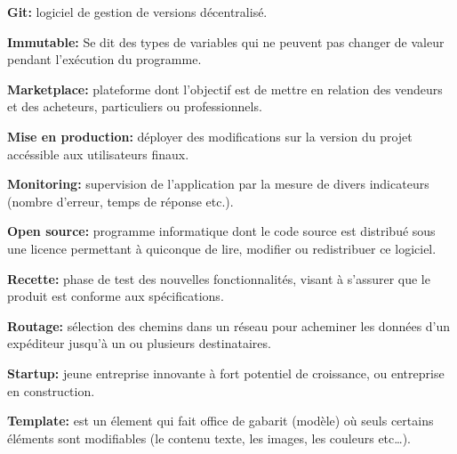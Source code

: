 \documentclass[12pt,a4paper]{article}
\begin{document}
  \bigskip

  \textbf{Git:} logiciel de gestion de versions décentralisé.

  \bigskip

  \textbf{Immutable:} Se dit des types de variables qui ne peuvent pas
  changer de valeur pendant l'exécution du programme.

  \bigskip

  \textbf{Marketplace:} plateforme dont l'objectif est de mettre en
  relation des vendeurs et des acheteurs, particuliers ou professionnels.

  \bigskip

  \textbf{Mise en production:} déployer des modifications sur la version
  du projet accéssible aux utilisateurs finaux.

  \bigskip

  \textbf{Monitoring:} supervision de l'application par la mesure de
  divers indicateurs (nombre d'erreur, temps de réponse etc.).

  \bigskip

  \textbf{Open source:} programme informatique dont le code source est
  distribué sous une licence permettant à quiconque de lire, modifier ou
  redistribuer ce logiciel.

  \bigskip

  \textbf{Recette:} phase de test des nouvelles fonctionnalités, visant à
  s'assurer que le produit est conforme aux spécifications.

  \bigskip

  \textbf{Routage:} sélection des chemins dans un réseau pour acheminer
  les données d'un expéditeur jusqu'à un ou plusieurs destinataires.

  \bigskip

  \textbf{Startup:} jeune entreprise innovante à fort potentiel de
  croissance, ou entreprise en construction.

  \bigskip

  \textbf{Template:} est un élement qui fait office de gabarit (modèle) où
  seuls certains éléments sont modifiables (le contenu texte, les images,
  les couleurs etc\ldots{}).


  \newpage

  \listoffigures
\end{document}
